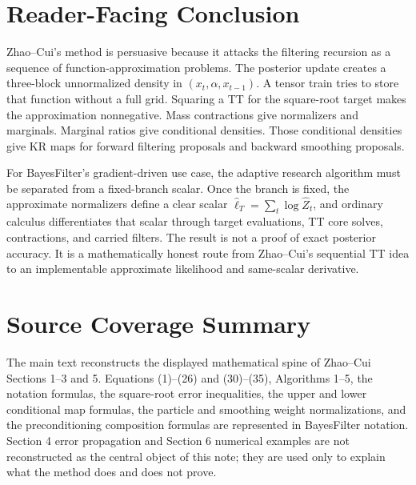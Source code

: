 \documentclass[11pt]{article}
\begin{document}
\section{Reader-Facing Conclusion}

Zhao--Cui's method is persuasive because it attacks the filtering recursion as
a sequence of function-approximation problems.  The posterior update creates a
three-block unnormalized density in \((x_t,\alpha,x_{t-1})\).  A tensor train
tries to store that function without a full grid.  Squaring a TT for the
square-root target makes the approximation nonnegative.  Mass contractions give
normalizers and marginals.  Marginal ratios give conditional densities.  Those
conditional densities give KR maps for forward filtering proposals and backward
smoothing proposals.

For BayesFilter's gradient-driven use case, the adaptive research algorithm
must be separated from a fixed-branch scalar.  Once the branch is fixed, the
approximate normalizers define a clear scalar
\(\widehat\ell_T=\sum_t\log\widehat Z_t\), and ordinary calculus differentiates
that scalar through target evaluations, TT core solves, contractions, and
carried filters.  The result is not a proof of exact posterior accuracy.  It is
a mathematically honest route from Zhao--Cui's sequential TT idea to an
implementable approximate likelihood and same-scalar derivative.

\appendix
\section{Source Coverage Summary}

The main text reconstructs the displayed mathematical spine of Zhao--Cui
Sections 1--3 and 5.  Equations (1)--(26) and (30)--(35), Algorithms 1--5,
the notation formulas, the square-root error inequalities, the upper and lower
conditional map formulas, the particle and smoothing weight normalizations, and
the preconditioning composition formulas are represented in BayesFilter
notation.  Section 4 error propagation and Section 6 numerical examples are
not reconstructed as the central object of this note; they are used only to
explain what the method does and does not prove.
\end{document}
